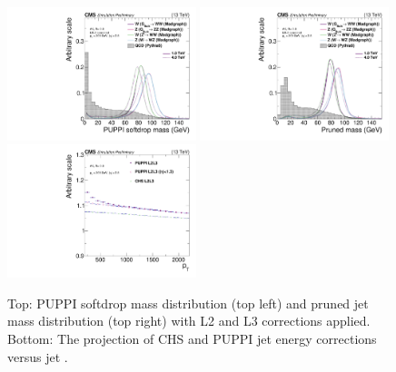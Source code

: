 \begin{figure}[htb]
\centering
\includegraphics[width=0.49\textwidth]{figures/analysis/search2/AN-16-235/plots/gen_SoftdropMass.pdf}
\includegraphics[width=0.49\textwidth]{figures/analysis/search2/AN-16-235/plots/gen_PrunedMass.pdf}\\
\includegraphics[width=0.49\textwidth]{figures/analysis/search2/AN-16-235/plots/JECvsPT.pdf}
\caption{Top: PUPPI softdrop mass distribution (top left) and pruned jet mass distribution (top right) with L2 and L3 corrections applied. Bottom: The projection of CHS and PUPPI jet energy corrections versus jet \PT.}
\label{fig:searchII:wtagmass}
\end{figure}

